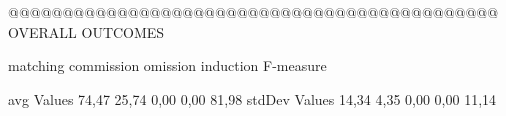 @@@@@@@@@@@@@@@@@@@@@@@@@@@@@@@@@@@@@@@@@@@@@ OVERALL OUTCOMES

               matching commission   omission  induction  F-measure
               
avg Values      74,47       25,74      0,00       0,00    81,98        
stdDev Values   14,34       4,35       0,00       0,00    11,14        